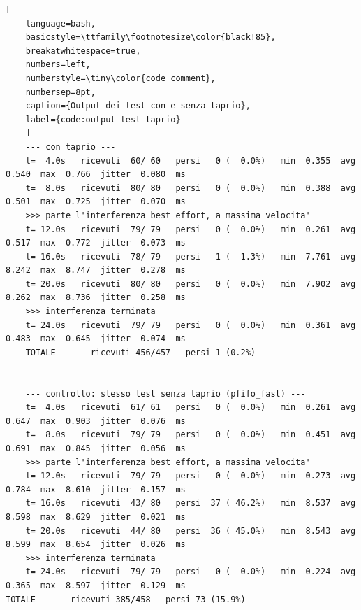 \documentclass[12pt,a4paper,twoside]{book}
\begin{document}
\begin{onehalfspace}
\begin{lstlisting}[
    language=bash,
    basicstyle=\ttfamily\footnotesize\color{black!85},
    breakatwhitespace=true,
    numbers=left,
    numberstyle=\tiny\color{code_comment},
    numbersep=8pt,
    caption={Output dei test con e senza taprio},
    label={code:output-test-taprio}
    ]
    --- con taprio ---
    t=  4.0s   ricevuti  60/ 60   persi   0 (  0.0%)   min  0.355  avg  0.540  max  0.766  jitter  0.080  ms
    t=  8.0s   ricevuti  80/ 80   persi   0 (  0.0%)   min  0.388  avg  0.501  max  0.725  jitter  0.070  ms
    >>> parte l'interferenza best effort, a massima velocita'
    t= 12.0s   ricevuti  79/ 79   persi   0 (  0.0%)   min  0.261  avg  0.517  max  0.772  jitter  0.073  ms
    t= 16.0s   ricevuti  78/ 79   persi   1 (  1.3%)   min  7.761  avg  8.242  max  8.747  jitter  0.278  ms
    t= 20.0s   ricevuti  80/ 80   persi   0 (  0.0%)   min  7.902  avg  8.262  max  8.736  jitter  0.258  ms
    >>> interferenza terminata
    t= 24.0s   ricevuti  79/ 79   persi   0 (  0.0%)   min  0.361  avg  0.483  max  0.645  jitter  0.074  ms
    TOTALE       ricevuti 456/457   persi 1 (0.2%)


    --- controllo: stesso test senza taprio (pfifo_fast) ---
    t=  4.0s   ricevuti  61/ 61   persi   0 (  0.0%)   min  0.261  avg  0.647  max  0.903  jitter  0.076  ms
    t=  8.0s   ricevuti  79/ 79   persi   0 (  0.0%)   min  0.451  avg  0.691  max  0.845  jitter  0.056  ms
    >>> parte l'interferenza best effort, a massima velocita'
    t= 12.0s   ricevuti  79/ 79   persi   0 (  0.0%)   min  0.273  avg  0.784  max  8.610  jitter  0.157  ms
    t= 16.0s   ricevuti  43/ 80   persi  37 ( 46.2%)   min  8.537  avg  8.598  max  8.629  jitter  0.021  ms
    t= 20.0s   ricevuti  44/ 80   persi  36 ( 45.0%)   min  8.543  avg  8.599  max  8.654  jitter  0.026  ms
    >>> interferenza terminata
    t= 24.0s   ricevuti  79/ 79   persi   0 (  0.0%)   min  0.224  avg  0.365  max  8.597  jitter  0.129  ms
TOTALE       ricevuti 385/458   persi 73 (15.9%)
\end{lstlisting}


\end{onehalfspace}
\end{document}
